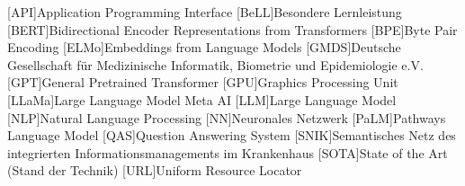 \begin{acronym}[SPARQL]
    [API]{Application Programming Interface}
    [BeLL]{Besondere Lernleistung}
    [BERT]{Bidirectional Encoder Representations from Transformers}
    [BPE]{Byte Pair Encoding}
    [ELMo]{Embeddings from Language Models}
    [GMDS]{Deutsche Gesellschaft für Medizinische Informatik, Biometrie und Epidemiologie e.V.}
    [GPT]{General Pretrained Transformer}
    [GPU]{Graphics Processing Unit}
    [LLaMa]{Large Language Model Meta AI}
    [LLM]{Large Language Model}
    [NLP]{Natural Language Processing}
    [NN]{Neuronales Netzwerk}
    [PaLM]{Pathways Language Model}
    [QAS]{Question Answering System}
    [SNIK]{Semantisches Netz des integrierten Informationsmanagements im Krankenhaus}
    [SOTA]{State of the Art (Stand der Technik)}
    [URL]{Uniform Resource Locator}
\end{acronym}
